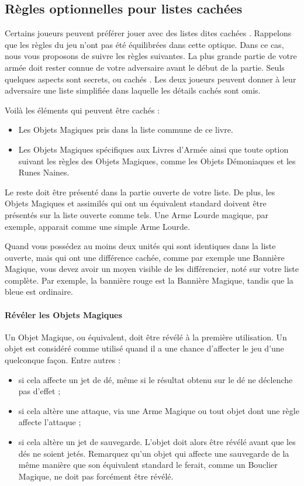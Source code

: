 \subsection{Règles optionnelles pour listes cachées}
\label{hidden_lists}

Certains joueurs peuvent préférer jouer avec des listes dites \og cachées \fg{}. Rappelons que les règles du jeu n'ont pas été équilibrées dans cette optique. Dans ce cas, nous vous proposons de suivre les règles suivantes. La plus grande partie de votre armée doit rester connue de votre adversaire avant le début de la partie. Seuls quelques aspects sont secrets, ou \og cachés \fg{}. Les deux joueurs peuvent donner à leur adversaire une liste simplifiée dans laquelle les détails cachés sont omis.

Voilà les éléments qui peuvent être cachés : 

\begin{itemize}[label={-}]
\item Les Objets Magiques pris dans la liste commune de ce livre.
\item Les Objets Magiques spécifiques aux Livres d'Armée ainsi que toute option suivant les règles des Objets Magiques, comme les Objets Démoniaques et les Runes Naines.
\end{itemize}

Le reste doit être présenté dans la partie ouverte de votre liste. De plus, les Objets Magiques et assimilés qui ont un équivalent standard doivent être présentés sur la liste ouverte comme tels. Une Arme Lourde magique, par exemple, apparait comme une simple Arme Lourde.

Quand vous possédez au moins deux unités qui sont identiques dans la liste ouverte, mais qui ont une différence cachée, comme par exemple une Bannière Magique, vous devez avoir un moyen visible de les différencier, noté sur votre liste complète. Par exemple, la bannière rouge est la Bannière Magique, tandis que la bleue est ordinaire.

\paragraph{Révéler les Objets Magiques}

Un Objet Magique, ou équivalent, doit être révélé à la première utilisation. Un objet est considéré comme utilisé quand il a une chance d'affecter le jeu d'une quelconque façon. Entre autres :
\begin{itemize}[label={-}]
\item si cela affecte un jet de dé, même si le résultat obtenu sur le dé ne déclenche pas d'effet ;
\item si cela altère une attaque, via une Arme Magique ou tout objet dont une règle affecte l'attaque ;
\item si cela altère un jet de sauvegarde. L'objet doit alors être révélé avant que les dés ne soient jetés. Remarquez qu'un objet qui affecte une sauvegarde de la même manière que son équivalent standard le ferait, comme un Bouclier Magique, ne doit pas forcément être révélé.
\end{itemize}

